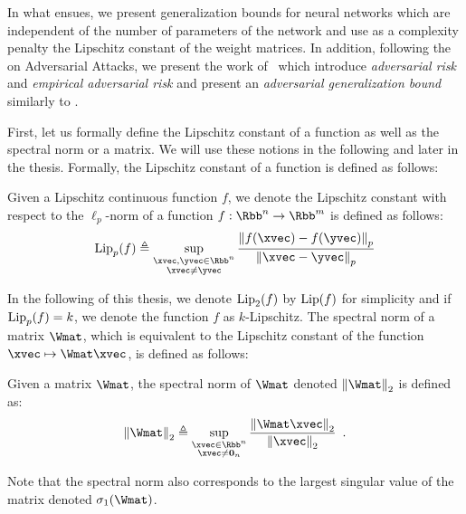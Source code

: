 In what ensues, we present generalization bounds for neural networks which are independent of the number of parameters of the network and use as a complexity penalty the Lipschitz constant of the weight matrices.
In addition, following the  on Adversarial Attacks, we present the work of~\citet{farnia2018generalizable} which introduce \emph{adversarial risk} and \emph{empirical adversarial risk} and present an \emph{adversarial generalization bound} similarly to \citet{bartlett2017spectrally}.

First, let us formally define the Lipschitz constant of a function as well as the spectral norm or a matrix.
We will use these notions in the following and later in the thesis.
Formally, the Lipschitz constant of a function is defined as follows: 
\begin{definition} \label{definition:ch3-lipschitz_constant}
  Given a Lipschitz continuous function $f$, we denote the Lipschitz constant with respect to the $\ell_p$-norm of a function $f: \Rbb^n \rightarrow \Rbb^m$ is defined as follows:
  \begin{equation}
  \lipp{p}{f} \triangleq \sup_{\substack{\xvec, \yvec \in \Rbb^n \\ \xvec \neq \yvec}} \frac{\norm{f(\xvec) - f(\yvec)}_p}{\norm{\xvec - \yvec}_p}
  \end{equation}
\end{definition}
\noindent
In the following of this thesis, we denote $\lipp{2}{f}$ by $\lip{f}$ for simplicity and if $\lipp{p}{f}=k$, we denote the function $f$ as $k$-Lipschitz.
The spectral norm of a matrix $\Wmat$, which is equivalent to the Lipschitz constant of the function $\xvec \mapsto \Wmat \xvec$, is defined as follows:
\begin{definition} \label{defintion:ch2-spectral_norm}
Given a matrix $\Wmat$, the spectral norm of $\Wmat$ denoted $\norm{\Wmat}_2$ is defined as:
  \begin{equation}
    \norm{\Wmat}_2 \triangleq \sup_{\substack{\xvec \in \Rbb^n \\ \xvec \neq \zerovec{n}}} \frac{\norm{\Wmat \xvec}_2}{\norm{\xvec}_2} \enspace.
  \end{equation}
  \removespace
\end{definition}
\noindent
Note that the spectral norm also corresponds to the largest singular value of the matrix denoted $\sigma_1(\Wmat)$.

